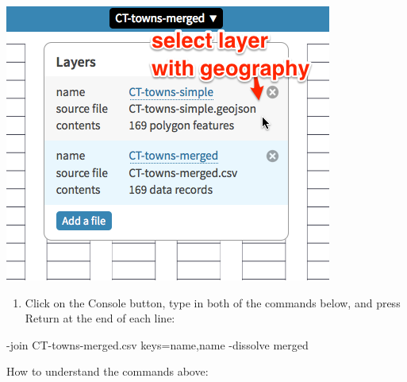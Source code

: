 \documentclass[
  english,
]{book}
\newenvironment{Shaded}{\begin{snugshade}}{\end{snugshade}}
\newcommand{\NormalTok}[1]{#1}
\providecommand{\tightlist}{%
  \setlength{\itemsep}{0pt}\setlength{\parskip}{0pt}}
\begin{document}
\includegraphics{images/09-transform/mapshaper-two-layers.png}

\begin{enumerate}
\def\labelenumi{\arabic{enumi}.}
\setcounter{enumi}{7}
\tightlist
\item
  Click on the Console button, type in both of the commands below, and press Return at the end of each line:
\end{enumerate}

\begin{Shaded}
\begin{Highlighting}[]
\NormalTok{{-}join CT{-}towns{-}merged.csv keys=name,name}
\NormalTok{{-}dissolve merged}
\end{Highlighting}
\end{Shaded}

How to understand the commands above:
\end{document}
